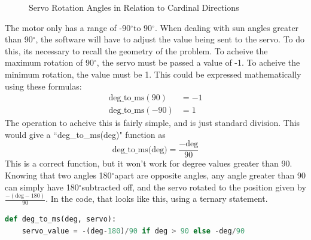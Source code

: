 \documentclass[titlepage]{article}
\newcommand{\degree}{$^{\circ}$}
\begin{document}
\begin{figure}[H]
    \centering
    \caption{Servo Rotation Angles in Relation to Cardinal Directions}
\end{figure}
The motor only has a range of -90\degree to 90\degree. When dealing with sun angles greater than 90\degree, the software will have to adjust the value being sent to the servo. To do this, its necessary to recall the geometry of the problem. To acheive the maximum rotation of 90\degree, the servo must be passed a value of -1. To acheive the minimum rotation, the value must be 1. This could be expressed mathematically using these formulas: 
\begin{equation*}
    \begin{split}
        \textrm{deg\_to\_ms}(90) & = -1 \\
        \textrm{deg\_to\_ms}(-90) & = 1
    \end{split}
\end{equation*}
The operation to acheive this is fairly simple, and is just standard division. This would give a ``deg\_to\_ms(deg)" function as 
\begin{equation}
    \textrm{deg\_to\_ms(deg)} = \frac{-\textrm{deg}}{90}
\end{equation}
This is a correct function, but it won't work for degree values greater than 90. Knowing that two angles 180\degree apart are opposite angles, any angle greater than 90 can simply have 180\degree subtracted off, and the servo rotated to the position given by $\frac{-(\textrm{deg} - 180)}{90}$. In the code, that looks like this, using a ternary statement.
\begin{lstlisting}[language=Python]
def deg_to_ms(deg, servo):
    servo_value = -(deg-180)/90 if deg > 90 else -deg/90 \end{lstlisting}
\end{document}
